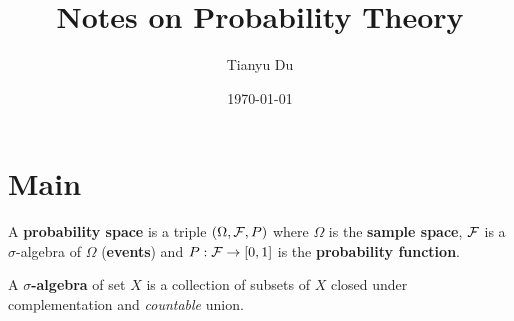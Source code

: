 \documentclass[11pt]{article}
\title{Notes on Probability Theory}
\date{\today}
\author{Tianyu Du}
\begin{document}
	\maketitle
	\tableofcontents
	
	\section{Main}
		\begin{definition}
			A \textbf{probability space} is a triple $(\Omega, \mathcal{{F}}, P)$ where $\Omega$ is the \textbf{sample space}, $\mathcal{{F}}$ is a $\sigma$-algebra of $\Omega$ (\textbf{events}) and $P: \mathcal{{F}} \to [0,1]$ is the \textbf{probability function}.
		\end{definition}
		
		\begin{definition}
			A \textbf{$\sigma$-algebra} of set $X$ is a collection of subsets of $X$ closed under complementation and \emph{countable} union.
		\end{definition}
		
		\begin{remark}
			
		\end{remark}
\end{document}
